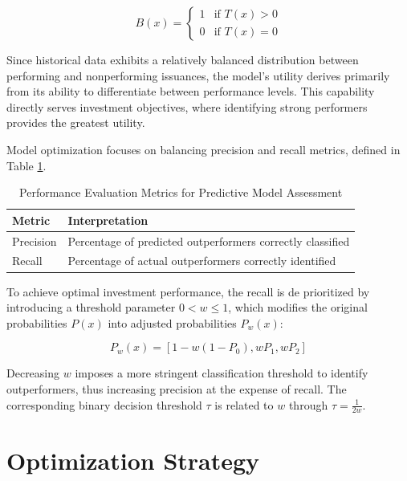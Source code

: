 \begin{equation}
B(x) =
\begin{cases}
1 & \text{if } T(x) > 0 \\
0 & \text{if } T(x) = 0
\end{cases}
\end{equation}

Since historical data exhibits a relatively balanced distribution between performing and nonperforming issuances, the model's utility derives primarily from its ability to differentiate between performance levels. This capability directly serves investment objectives, where identifying strong performers provides the greatest utility.

Model optimization focuses on balancing precision and recall metrics, defined in Table \ref{tab:precision_recall_definitions}.

\begin{table}[h]
\centering
\small
\begin{tabular}{ll}\toprule
\textbf{Metric} & \textbf{Interpretation} \\\midrule
Precision & Percentage of predicted outperformers correctly classified \\
Recall & Percentage of actual outperformers correctly identified \\\bottomrule
\end{tabular}
\caption{Performance Evaluation Metrics for Predictive Model Assessment}
\label{tab:precision_recall_definitions}
\end{table}

To achieve optimal investment performance, the recall is de prioritized by introducing a threshold parameter $0 < w \leq 1$, which modifies the original probabilities $P(x)$ into adjusted probabilities $P_w(x)$:

\begin{equation}
P_w(x) = [1 - w(1 - P_0), wP_1, wP_2]
\end{equation}

Decreasing $w$ imposes a more stringent classification threshold to identify outperformers, thus increasing precision at the expense of recall. The corresponding binary decision threshold $\tau$ is related to $w$ through $\tau = \frac{1}{2w}$.

\section{Optimization Strategy}
\label{sec:optimization}

